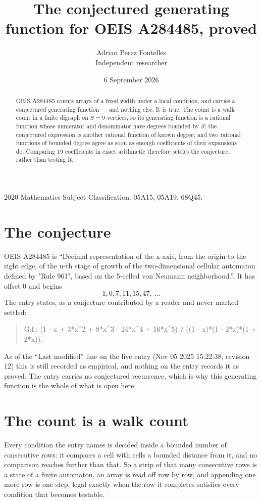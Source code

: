 \documentclass[11pt,a4paper]{article}
\title{The conjectured generating function for OEIS A284485, proved}
\author{Adrian Perez Fontelles\\ \small Independent researcher}
\date{6 September 2026}
\theoremstyle{plain}
\theoremstyle{definition}
\begin{document}
\maketitle

\begin{abstract}
OEIS A284485 counts arrays of a fixed width under a local condition, and carries a conjectured
generating function --- and nothing else. It is true. The count is a walk count in a finite
digraph on $S=9$ vertices, so its generating function is a rational function whose numerator
and denominator have degrees bounded by $S$; the conjectured expression is another rational
function of known degree; and two rational functions of bounded degree agree as soon as enough
coefficients of their expansions do. Comparing $19$ coefficients in exact arithmetic
therefore settles the conjecture, rather than testing it.
\end{abstract}

\noindent\small 2020 Mathematics Subject Classification. 05A15, 05A19, 68Q45.\normalsize

\section{The conjecture}

OEIS A284485 is ``Decimal representation of the x-axis, from the origin to the right edge, of the n-th stage of growth of the two-dimensional cellular automaton defined by "Rule 961", based on the 5-celled von Neumann neighborhood.''. It has offset $0$ and begins
\[
1, 0, 7, 11, 15, 47,\ \dots
\]
The entry states, as a conjecture contributed by a reader and never marked settled:
\begin{quote}
G.f.: (1 - x + 3*x\^{}2 + 8*x\^{}3 - 24*x\^{}4 + 16*x\^{}5) / ((1 - x)*(1 - 2*x)*(1 + 2*x)).
\end{quote}
As of the ``Last modified'' line on the live entry (Nov 05 2025 15:22:38, revision 12) this is still
recorded as empirical, and nothing on the entry records it as proved. The entry carries no
conjectured recurrence, which is why this generating function is the whole of what is open
here.

\section{The count is a walk count}

Every condition the entry names is decided inside a bounded number of consecutive rows: it
compares a cell with cells a bounded distance from it, and no comparison reaches further than
that. So a strip of that many consecutive rows is a state of a finite automaton, an array is
read off row by row, and appending one more row is one step, legal exactly when the row it
completes satisfies every condition that becomes testable.
\end{document}
